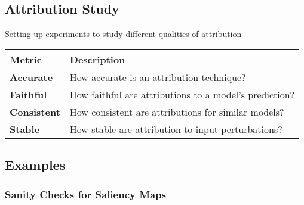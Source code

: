 \subsection{Attribution Study}
\begin{summary} Setting up experiments to study different qualities of attribution
    \vspace{1em}
    \begin{center}
        \begin{tabular}{ll}
            \toprule
            \textbf{Metric} & \textbf{Description} \\
            \midrule
            \textbf{Accurate} & How accurate is an attribution technique? \\
            \midrule
            \textbf{Faithful} & How faithful are attributions to a model's prediction?\\
            \midrule
            \textbf{Consistent} & How consistent are attributions for similar models?\\
            \midrule
            \textbf{Stable} & How stable are attribution to input perturbations? \\
            \bottomrule
        \end{tabular}
    \end{center}    
\end{summary}
\newpage

\subsection{Examples}
\subsubsection{Sanity Checks for Saliency Maps}
\begin{example}
\end{example}
\newpage

